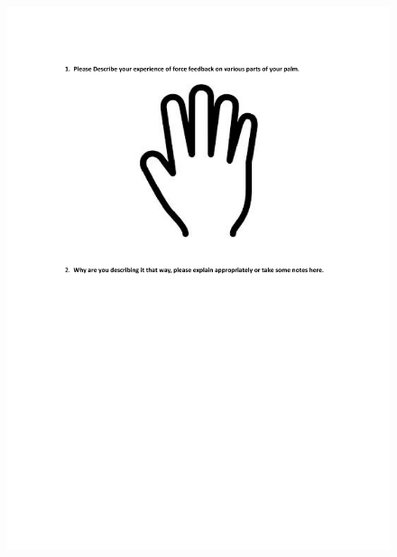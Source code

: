 \begin{figure}[h]
\centering
\includegraphics[width=1\textwidth,height=0.7\textheight]{A_thesis/appendix/Experiment1_questionnaire-7.png}
\end{figure}
\newpage

